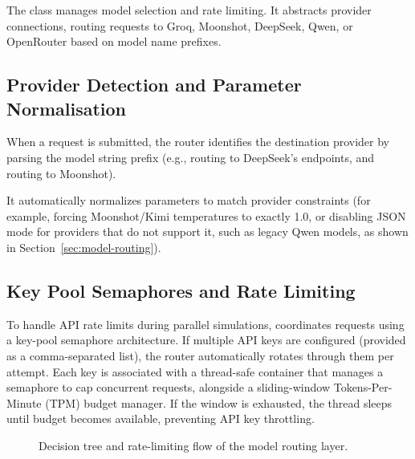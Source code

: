 The  class manages model selection and rate limiting. It abstracts provider connections, routing requests to Groq, Moonshot, DeepSeek, Qwen, or OpenRouter based on model name prefixes.

\subsection{Provider Detection and Parameter Normalisation}
\label{sec:provider-detection}

When a request is submitted, the router identifies the destination provider by parsing the model string prefix (e.g.,  routing to DeepSeek's endpoints, and  routing to Moonshot). 

It automatically normalizes parameters to match provider constraints (for example, forcing Moonshot/Kimi temperatures to exactly 1.0, or disabling JSON mode for providers that do not support it, such as legacy Qwen models, as shown in Section~\ref{sec:model-routing}).

\subsection{Key Pool Semaphores and Rate Limiting}
\label{sec:key-pool-semaphores}

To handle API rate limits during parallel simulations, \versimux{} coordinates requests using a key-pool semaphore architecture. If multiple API keys are configured (provided as a comma-separated list), the router automatically rotates through them per attempt. Each key is associated with a thread-safe  container that manages a semaphore to cap concurrent requests, alongside a sliding-window Tokens-Per-Minute (TPM) budget manager. If the window is exhausted, the thread sleeps until budget becomes available, preventing API key throttling.

\begin{figure}[htbp]
  \centering
  \caption{Decision tree and rate-limiting flow of the model routing layer.}
  \label{fig:model-routing-tree}
\end{figure}


